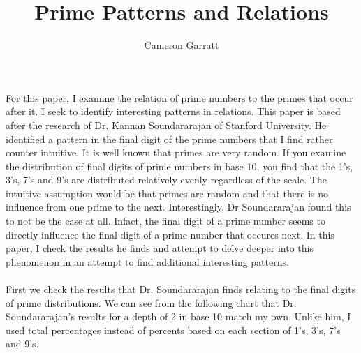 \documentclass[13pt]{article}
\title{Prime Patterns and Relations}
\author{Cameron Garratt}
\begin{document}
\maketitle
\large
For this paper, I examine the relation of prime numbers to the primes that occur after it. 
I seek to identify interesting patterns in relations. 
This paper is based after the research of Dr. 
Kannan Soundararajan of Stanford University. 
He identified a pattern in the final digit of the prime numbers that I find rather counter intuitive. 
It is well known that primes are very random. 
If you examine the distribution of final digits of prime numbers in base 10, you find that the 1's, 3's, 7's and 9's are distributed relatively evenly regardless of the scale. 
The intuitive assumption would be that primes are random and that there is no influence from one prime to the next. 
Interestingly, Dr Soundararajan found this to not be the case at all. 
Infact, the final digit of a prime number seems to directly influence the final digit of a prime number that occures next.
In this paper, I check the results he finds and attempt to delve deeper into this phenomenon in an attempt to find additional interesting patterns.\\\\
\indent
First we check the results that Dr. Soundararajan finds relating to the final digits of prime distributions. We can see from the following chart that Dr. Soundararajan's results for a depth of 2 in base 10 match my own. Unlike him, I used total percentages instead of percents based on each section of 1's, 3's, 7's and 9's.\\\\
\end{document}

